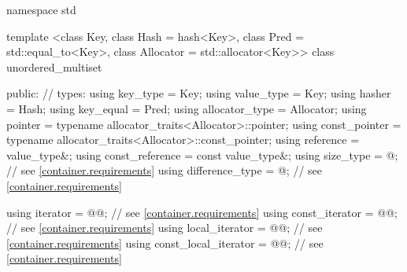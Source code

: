 %
\begin{codeblock}
namespace std {
  template <class Key,
            class Hash = hash<Key>,
            class Pred = std::equal_to<Key>,
            class Allocator = std::allocator<Key>>
  class unordered_multiset {
  public:
    // types:
    using key_type             = Key;
    using value_type           = Key;
    using hasher               = Hash;
    using key_equal            = Pred;
    using allocator_type       = Allocator;
    using pointer              = typename allocator_traits<Allocator>::pointer;
    using const_pointer        = typename allocator_traits<Allocator>::const_pointer;
    using reference            = value_type&;
    using const_reference      = const value_type&;
    using size_type            = @\impdef@; // see \ref{container.requirements}
    using difference_type      = @\impdef@; // see \ref{container.requirements}

    using iterator             = @@; // see \ref{container.requirements}
    using const_iterator       = @@; // see \ref{container.requirements}
    using local_iterator       = @@; // see \ref{container.requirements}
    using const_local_iterator = @@; // see \ref{container.requirements}

}}
\end{codeblock}
